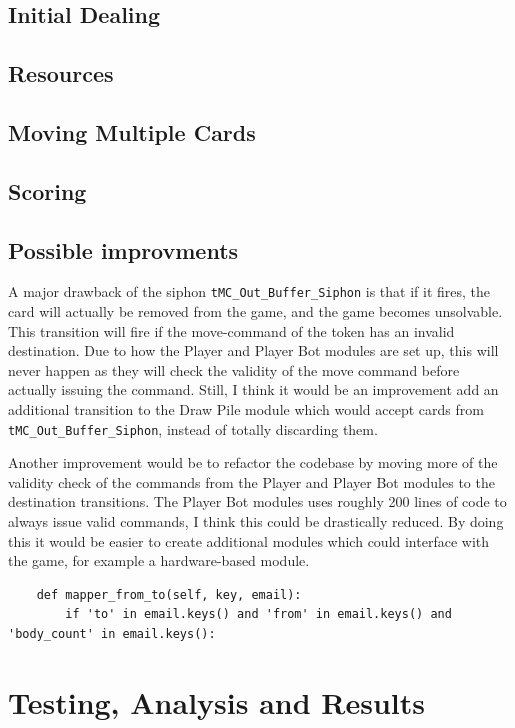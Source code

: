 \documentclass[runningheads,a4paper]{llncs}
\begin{document}
\subsection{Initial Dealing}
\subsection{Resources}
\label{sec:3_Resources}
\subsection{Moving Multiple Cards}
\subsection{Scoring}
\subsection{Possible improvments}
A major drawback of the siphon \verb!tMC_Out_Buffer_Siphon! is that if it fires, the card will actually be removed from the game, and the game becomes unsolvable. This transition will fire if the move-command of the token has an invalid destination. Due to how the Player and Player Bot modules are set up, this will never happen as they will check the validity of the move command before actually issuing the command. Still, I think it would be an improvement add an additional transition to the Draw Pile module which would accept cards from \verb!tMC_Out_Buffer_Siphon!, instead of totally discarding them.
\newline

Another improvement would be to refactor the codebase by moving more of the validity check of the commands from the Player and Player Bot modules to the destination transitions. The Player Bot modules uses roughly 200 lines of code to always issue valid commands, I think this could be drastically reduced. By doing this it would be easier to create additional modules which could interface with the game, for example a hardware-based module.

\begin{verbatim}
    def mapper_from_to(self, key, email):
        if 'to' in email.keys() and 'from' in email.keys() and 'body_count' in email.keys():
\end{verbatim}

\section{Testing, Analysis and Results}
\end{document}
